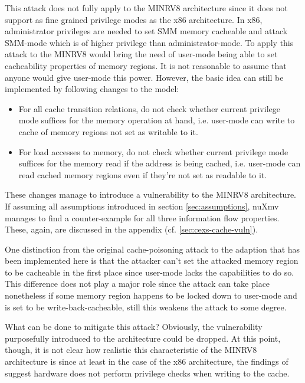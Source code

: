 This attack does not fully apply to the MINRV8 architecture since it does not support as fine grained privilege modes as the x86 architecture.
In x86, administrator privileges are needed to set SMM memory cacheable and attack SMM-mode which is of higher privilege than administrator-mode.
To apply this attack to the MINRV8 would bring the need of user-mode being able to set cacheability properties of memory regions.
It is not reasonable to assume that anyone would give user-mode this power.
However, the basic idea can still be implemented by following changes to the model:
\begin{itemize}
    \item For all cache transition relations, do not check whether current privilege mode suffices for the memory operation at hand, i.e. user-mode can write to cache of memory regions not set as writable to it.
    \item For load accesses to memory, do not check whether current privilege mode suffices for the memory read if the address is being cached, i.e. user-mode can read cached memory regions even if they're not set as readable to it.
\end{itemize}

These changes manage to introduce a vulnerability to the MINRV8 architecture.
If assuming all assumptions introduced in section \ref{sec:assumptions}, nuXmv manages to find a counter-example for all three information flow properties.
These, again, are discussed in the appendix (cf. \ref{sec:cexs-cache-vuln}).

One distinction from the original cache-poisoning attack to the adaption that has been implemented here is that the attacker can't set the attacked memory region to be cacheable in the first place since user-mode lacks the capabilities to do so.
This difference does not play a major role since the attack can take place nonetheless if some memory region happens to be locked down to user-mode and is set to be write-back-cacheable, still this weakens the attack to some degree.

What can be done to mitigate this attack?
Obviously, the vulnerability purposefully introduced to the architecture could be dropped.
At this point, though, it is not clear how realistic this characteristic of the MINRV8 architecture is since at least in the case of the x86 architecture, the findings of \cite{Wojtczuk09} suggest hardware does not perform privilege checks when writing to the cache.

